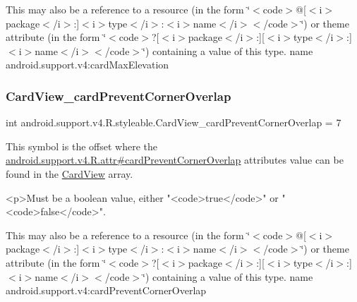 This may also be a reference to a resource (in the form \char`\"{}$<$code$>$@\mbox{[}$<$i$>$package$<$/i$>$\+:\mbox{]}$<$i$>$type$<$/i$>$\+:$<$i$>$name$<$/i$>$$<$/code$>$\char`\"{}) or theme attribute (in the form \char`\"{}$<$code$>$?\mbox{[}$<$i$>$package$<$/i$>$\+:\mbox{]}\mbox{[}$<$i$>$type$<$/i$>$\+:\mbox{]}$<$i$>$name$<$/i$>$$<$/code$>$\char`\"{}) containing a value of this type.  name android.\+support.\+v4\+:card\+Max\+Elevation \mbox{\label{classandroid_1_1support_1_1v4_1_1R_1_1styleable_adca5c81b9e709af7b9e1770499743d3b}} 
\subsubsection{\texorpdfstring{Card\+View\+\_\+card\+Prevent\+Corner\+Overlap}{CardView\_cardPreventCornerOverlap}}
{\footnotesize\ttfamily int android.\+support.\+v4.\+R.\+styleable.\+Card\+View\+\_\+card\+Prevent\+Corner\+Overlap = 7\hspace{0.3cm}{\ttfamily [static]}}

This symbol is the offset where the \hyperlink{classandroid_1_1support_1_1v4_1_1R_1_1attr_a357305c5fc8069cdf7a25ce68201357f}{android.\+support.\+v4.\+R.\+attr\#card\+Prevent\+Corner\+Overlap} attribute\textquotesingle{}s value can be found in the \hyperlink{classandroid_1_1support_1_1v4_1_1R_1_1styleable_a0e520cd4c78beb0d456e4018c4ba0e86}{Card\+View} array.

\begin{DoxyVerb}      <p>Must be a boolean value, either "<code>true</code>" or "<code>false</code>".
\end{DoxyVerb}
 

This may also be a reference to a resource (in the form \char`\"{}$<$code$>$@\mbox{[}$<$i$>$package$<$/i$>$\+:\mbox{]}$<$i$>$type$<$/i$>$\+:$<$i$>$name$<$/i$>$$<$/code$>$\char`\"{}) or theme attribute (in the form \char`\"{}$<$code$>$?\mbox{[}$<$i$>$package$<$/i$>$\+:\mbox{]}\mbox{[}$<$i$>$type$<$/i$>$\+:\mbox{]}$<$i$>$name$<$/i$>$$<$/code$>$\char`\"{}) containing a value of this type.  name android.\+support.\+v4\+:card\+Prevent\+Corner\+Overlap \mbox{\label{classandroid_1_1support_1_1v4_1_1R_1_1styleable_aa052776cfb54eff97c0459a640052f49}} 
